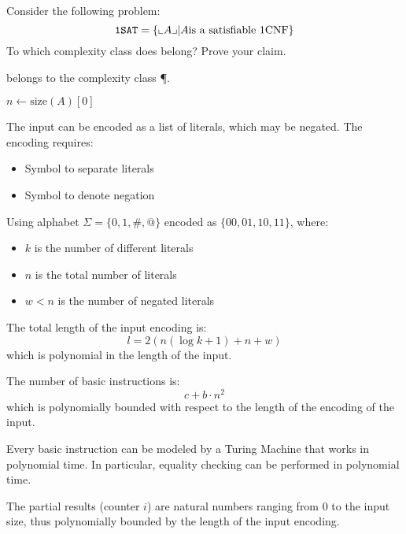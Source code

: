 \begin{ex}[\kSAT{1}]
	Consider the following problem:
	\[
		\kSAT{1} = \{ \enc{A} | A \text{is a satisfiable 1CNF} \}
	\]
	To which complexity class does  belong? Prove your claim.

	\begin{solution}
		 belongs to the complexity class \P.

		\begin{algorithm}
			\caption{}\label{alg:onesat}
			$n \gets \text{size}(A)[0]$\;
			\;
		\end{algorithm}

		The input can be encoded as a list of literals, which may be negated. The encoding requires:
		\begin{itemize}
			\item Symbol to separate literals
			\item Symbol to denote negation
		\end{itemize}
		Using alphabet $\Sigma = \{0,1,\#,@\}$ encoded as $\{00,01,10,11\}$, where:
		\begin{itemize}
			\item $k$ is the number of different literals
			\item $n$ is the total number of literals
			\item $w < n$ is the number of negated literals
		\end{itemize}

		The total length of the input encoding is:
		\[l = 2(n(\log k + 1) + n + w)\]
		which is polynomial in the length of the input.

		The number of basic instructions is:
		\[c + b \cdot n^2\]
		which is polynomially bounded with respect to the length of the encoding of the input.

		Every basic instruction can be modeled by a Turing Machine that works in polynomial time. In particular, equality checking can be performed in polynomial time.

		The partial results (counter $i$) are natural numbers ranging from 0 to the input size, thus polynomially bounded by the length of the input encoding.


\end{solution}
\end{ex}
